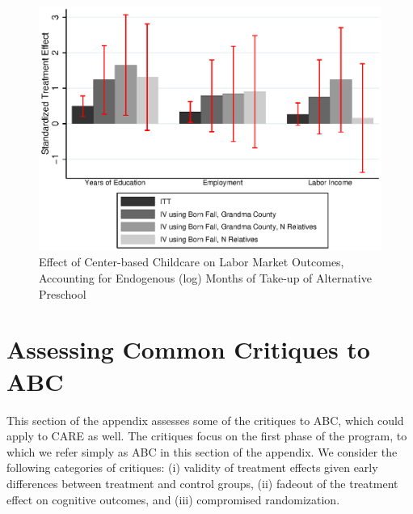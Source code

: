 \begin{appendices}
\begin{figure}[H]
		\caption{Effect of Center-based Childcare on Labor Market Outcomes, Accounting for Endogenous (log) Months of Take-up of Alternative Preschool} \label{output/appendixplots/Q_cf_te.eps}
		\includegraphics[width=.7\columnwidth]{output/appendixplots/ins_inter_logQ_iv_other.eps}
\end{figure}

\setcounter{figure}{0}  \renewcommand{\thefigure}{E.\arabic{figure}}
\setcounter{table}{0}   \renewcommand{\thetable}{E.\arabic{table}}
\section{Assessing Common Critiques to ABC} \label{appendix:assessingcc}

\noindent This section of the appendix assesses some of the critiques to ABC, which could apply to CARE as well. The critiques focus on the first phase of the program, to which we refer simply as ABC in this section of the appendix. We consider the following categories of critiques: (i) validity of treatment effects given early differences between treatment and control groups, (ii) fadeout of the treatment effect on cognitive outcomes, and (iii) compromised randomization. \\


\end{appendices}
